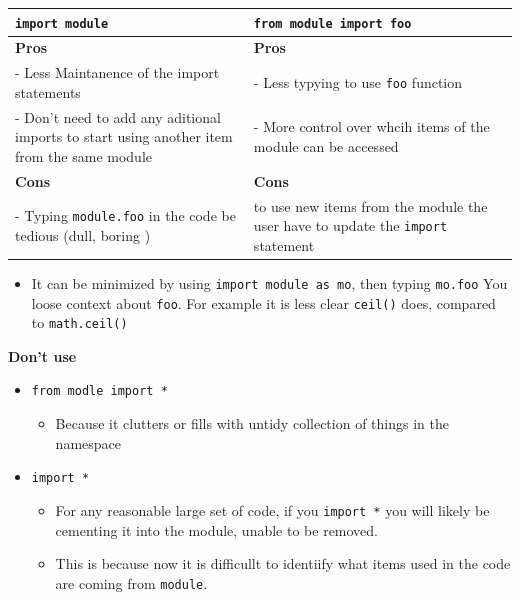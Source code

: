 \documentclass[
]{book}
\providecommand{\tightlist}{%
  \setlength{\itemsep}{0pt}\setlength{\parskip}{0pt}}
\begin{document}
\begin{longtable}[]{@{}
  >{\raggedright\arraybackslash}p{}
  >{\raggedright\arraybackslash}p{}@{}}
\toprule
\texttt{import\ module} & \texttt{from\ module\ import\ foo} \\
\midrule
\endhead
\textbf{Pros} & \textbf{Pros} \\
- Less Maintanence of the import statements & - Less typying to use \texttt{foo} function \\
- Don't need to add any aditional imports to start using another item from the same module & - More control over whcih items of the module can be accessed \\
\textbf{Cons} & \textbf{Cons} \\
- Typing \texttt{module.foo} in the code be tedious (dull, boring ) & to use new items from the module the user have to update the \texttt{import} statement \\
\bottomrule
\end{longtable}

\begin{itemize}
\tightlist
\item
  It can be minimized by using \texttt{import\ module\ as\ mo}, then typing \texttt{mo.foo} \textbar{} You loose context about \texttt{foo}. For example it is less clear \texttt{ceil()} does, compared to \texttt{math.ceil()}
\end{itemize}

\textbf{Don't use}

\begin{itemize}
\item
  \texttt{from\ modle\ import\ *}

  \begin{itemize}
  \tightlist
  \item
    Because it clutters or fills with untidy collection of things in the namespace
  \end{itemize}
\item
  \texttt{import\ *}

  \begin{itemize}
  \item
    For any reasonable large set of code, if you \texttt{import\ *} you will likely be cementing it into the module, unable to be removed.
  \item
    This is because now it is difficullt to identiify what items used in the code are coming from \texttt{module}.
  \end{itemize}
\end{itemize}
\end{document}
